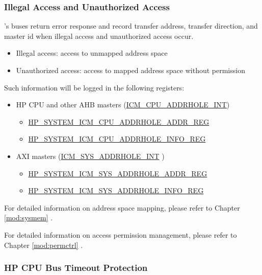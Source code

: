 \documentclass[main\_\_EN.tex]{subfiles}
\begin{document}
\subsubsection{Illegal Access and Unauthorized Access}

\chipname{}'s buses return error response and record transfer address, transfer direction, and master id when illegal access and unauthorized access occur.

\begin{itemize}
    \item Illegal access: access to unmapped address space
    \item Unauthorized access: access to mapped address space without permission
\end{itemize}

Such information will be logged in the following registers:

\begin{itemize}
    \item HP CPU and other AHB masters (\hyperref[tab:sysreg-int-sources]{ICM\_CPU\_ADDRHOLE\_INT})
    \begin{itemize}
        \item \hyperref[regdesc:HPSYSTEMICMCPUADDRHOLEADDRREG]{HP\_SYSTEM\_ICM\_CPU\_ADDRHOLE\_ADDR\_REG}
        \item \hyperref[regdesc:HPSYSTEMICMCPUADDRHOLEINFOREG]{HP\_SYSTEM\_ICM\_CPU\_ADDRHOLE\_INFO\_REG}
    \end{itemize}
    \item AXI masters (\hyperref[tab:sysreg-int-sources]{ICM\_SYS\_ADDRHOLE\_INT} )
    \begin{itemize}
        \item \hyperref[regdesc:HPSYSTEMICMSYSADDRHOLEADDRREG]{HP\_SYSTEM\_ICM\_SYS\_ADDRHOLE\_ADDR\_REG}
        \item \hyperref[regdesc:HPSYSTEMICMSYSADDRHOLEINFOREG]{HP\_SYSTEM\_ICM\_SYS\_ADDRHOLE\_INFO\_REG}
\end{itemize}
\end{itemize}

For detailed information on address space mapping, please refer to Chapter \ref{mod:sysmem} \textit{}.

For detailed information on access permission management, please refer to Chapter \ref{mod:permctrl} \textit{}.


\subsubsection{HP CPU Bus Timeout Protection}
\end{document}
